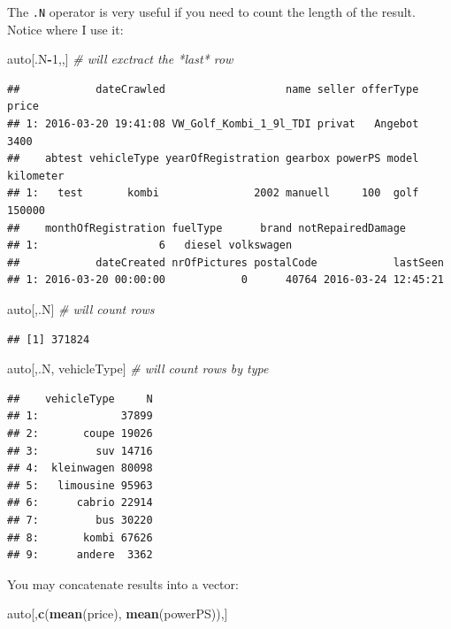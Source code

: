\documentclass[]{book}
\newenvironment{Shaded}{\begin{snugshade}}{\end{snugshade}}
\newcommand{\KeywordTok}[1]{\textcolor[rgb]{0.13,0.29,0.53}{\textbf{#1}}}
\newcommand{\DecValTok}[1]{\textcolor[rgb]{0.00,0.00,0.81}{#1}}
\newcommand{\CommentTok}[1]{\textcolor[rgb]{0.56,0.35,0.01}{\textit{#1}}}
\newcommand{\OperatorTok}[1]{\textcolor[rgb]{0.81,0.36,0.00}{\textbf{#1}}}
\newcommand{\NormalTok}[1]{#1}
\theoremstyle{definition}
\theoremstyle{definition}
\theoremstyle{definition}
\theoremstyle{remark}
\begin{document}
The \texttt{.N} operator is very useful if you need to count the length
of the result. Notice where I use it:

\begin{Shaded}
\begin{Highlighting}[]
\NormalTok{auto[.N}\OperatorTok{-}\DecValTok{1}\NormalTok{,,] }\CommentTok{# will exctract the *last* row}
\end{Highlighting}
\end{Shaded}

\begin{verbatim}
##            dateCrawled                   name seller offerType price
## 1: 2016-03-20 19:41:08 VW_Golf_Kombi_1_9l_TDI privat   Angebot  3400
##    abtest vehicleType yearOfRegistration gearbox powerPS model kilometer
## 1:   test       kombi               2002 manuell     100  golf    150000
##    monthOfRegistration fuelType      brand notRepairedDamage
## 1:                   6   diesel volkswagen                  
##            dateCreated nrOfPictures postalCode            lastSeen
## 1: 2016-03-20 00:00:00            0      40764 2016-03-24 12:45:21
\end{verbatim}

\begin{Shaded}
\begin{Highlighting}[]
\NormalTok{auto[,.N] }\CommentTok{# will count rows}
\end{Highlighting}
\end{Shaded}

\begin{verbatim}
## [1] 371824
\end{verbatim}

\begin{Shaded}
\begin{Highlighting}[]
\NormalTok{auto[,.N, vehicleType] }\CommentTok{# will count rows by type}
\end{Highlighting}
\end{Shaded}

\begin{verbatim}
##    vehicleType     N
## 1:             37899
## 2:       coupe 19026
## 3:         suv 14716
## 4:  kleinwagen 80098
## 5:   limousine 95963
## 6:      cabrio 22914
## 7:         bus 30220
## 8:       kombi 67626
## 9:      andere  3362
\end{verbatim}

You may concatenate results into a vector:

\begin{Shaded}
\begin{Highlighting}[]
\NormalTok{auto[,}\KeywordTok{c}\NormalTok{(}\KeywordTok{mean}\NormalTok{(price), }\KeywordTok{mean}\NormalTok{(powerPS)),]}
\end{Highlighting}
\end{Shaded}
\end{document}
